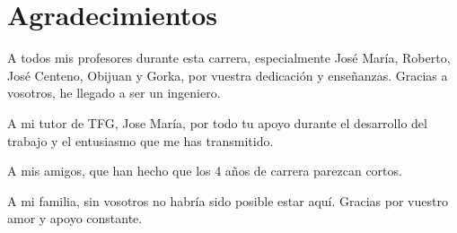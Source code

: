 \chapter*{Agradecimientos}

\noindent A todos mis profesores durante esta carrera, especialmente José María, Roberto, José Centeno, Obijuan y Gorka, por vuestra dedicación y enseñanzas. Gracias a vosotros, he llegado a ser un ingeniero. 

\noindent A mi tutor de TFG, Jose María, por todo tu apoyo durante el desarrollo del trabajo y el entusiasmo que me has transmitido. 

\noindent A mis amigos, que han hecho que los 4 años de carrera parezcan cortos. 

\noindent A mi familia, sin vosotros no habría sido posible estar aquí. Gracias por vuestro amor y apoyo constante. 

\vspace{2cm}



